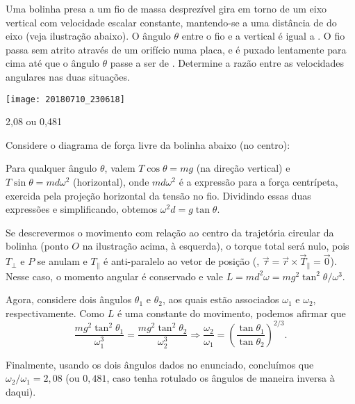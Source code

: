 \begin{question}
    Uma bolinha presa a um fio de massa desprezível gira em torno de um eixo vertical com velocidade escalar constante, mantendo-se a uma distância de  do eixo (veja ilustração abaixo).
    O ângulo $\theta$ entre o fio e a vertical é igual a .
    O fio passa sem atrito através de um orifício numa placa, e é puxado lentamente para cima até que o ângulo $\theta$ passe a ser de .
    Determine a razão entre as velocidades angulares nas duas situações.

    \begin{center}
      \texttt{[image: 20180710\_230618]}
    \end{center}

    \begin{answer}
      2,08 ou 0,481
    \end{answer}
    
    \begin{solution}
      Considere o diagrama de força livre da bolinha abaixo (no centro):


      Para qualquer ângulo $\theta$, valem $T \cos\theta = mg$ (na direção vertical) e $T \sin\theta = md\omega^2$ (horizontal), onde $md\omega^2$ é a expressão para a força centrípeta, exercida pela projeção horizontal da tensão no fio.
      Dividindo essas duas expressões e simplificando, obtemos $\omega^2 d = g \tan\theta$.

      Se descrevermos o movimento com relação ao centro da trajetória circular da bolinha (ponto $O$ na ilustração acima, à esquerda), o torque total será nulo, pois $T_{\perp}$ e $P$ se anulam e $T_{\parallel}$ é anti-paralelo ao vetor de posição (\ie, $\vec\tau = \vec r \times \vec T_{\parallel} = \vec 0$).
      Nesse caso, o momento angular é conservado e vale $L = md^2\omega = mg^2\tan^2\theta/\omega^3$.

      Agora, considere dois ângulos $\theta_1$ e $\theta_2$, aos quais estão associados $\omega_1$ e $\omega_2$, respectivamente.
      Como $L$ é uma constante do movimento, podemos afirmar que
      \begin{equation*}
        \frac{mg^2\tan^2\theta_1}{\omega_1^3} = \frac{mg^2\tan^2\theta_2}{\omega_2^3} \Rightarrow \frac{\omega_2}{\omega_1} = \left(\frac{\tan\theta_1}{\tan\theta_2}\right)^{2/3}.
      \end{equation*}

      Finalmente, usando os dois ângulos dados no enunciado, concluímos que $\omega_2/\omega_1 = 2,08$ (ou $0,481$, caso tenha rotulado os ângulos de maneira inversa à daqui).
    \end{solution}
\end{question}